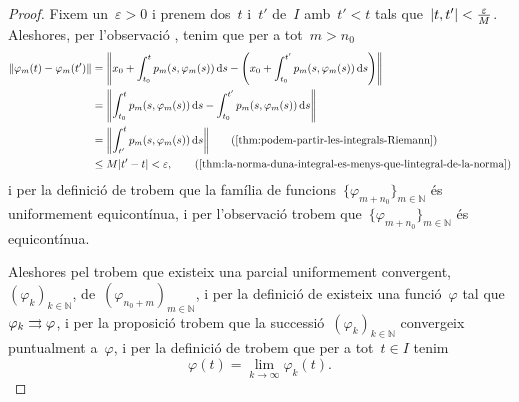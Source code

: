 \documentclass[../equacions-diferencials-I.tex]{subfiles}
\begin{document}
\begin{proof}
        Fixem un~\(\varepsilon>0\) i prenem dos~\(t\) i~\(t'\) de~\(I\) amb~\(t'<t\) tals que~\(\abs{t,t'}<\frac{\varepsilon}{M}\).
        Aleshores, per l'observació , tenim que per a tot~\(m>n_{0}\)
        \begin{align*}
            \norm{\varphi_{m}(t)-\varphi_{m}(t')}&=\norm{x_{0}+\int_{t_{0}}^{t}p_{m}(s,\varphi_{m}(s))\diff s-\Bigg(x_{0}+\int_{t_{0}}^{t'}p_{m}(s,\varphi_{m}(s))\diff s\Bigg)} \\
            &=\norm{\int_{t_{0}}^{t}p_{m}(s,\varphi_{m}(s))\diff s-\int_{t_{0}}^{t'}p_{m}(s,\varphi_{m}(s))\diff s} \\
            &=\norm{\int_{t'}^{t}p_{m}(s,\varphi_{m}(s))\diff s} \tag{\ref{thm:podem-partir-les-integrals-Riemann}} \\
            &\leq M\abs{t'-t}<\varepsilon, \tag{\ref{thm:la-norma-duna-integral-es-menys-que-lintegral-de-la-norma}}
        \end{align*}
        i per la definició de  trobem que la família de funcions~\(\{\varphi_{m+n_{0}}\}_{m\in\mathbb{N}}\) és uniformement equicontínua, i per l'observació  trobem que~\(\{\varphi_{m+n_{0}}\}_{m\in\mathbb{N}}\) és equicontínua.

        Aleshores pel  trobem que existeix una parcial uniformement convergent,~\((\varphi_{k})_{k\in\mathbb{N}}\), de~\((\varphi_{n_{0}+m})_{m\in\mathbb{N}}\), i per la definició de  existeix una funció~\(\varphi\) tal que~\(\varphi_{k}\mathrel{\rightrightarrows}\varphi\), i per la proposició  trobem que la successió~\((\varphi_{k})_{k\in\mathbb{N}}\) convergeix puntualment a~\(\varphi\), i per la definició de  trobem que per a tot~\(t\in I\) tenim
        \begin{equation}
            \label{thm:Teorema-de-Peano:eq1}
            \varphi(t)=\lim_{k\to\infty}\varphi_{k}(t).
        \end{equation}


\end{proof}
\end{document}
